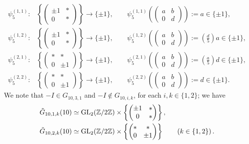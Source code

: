 \[
\begin{split}
\psi_5^{(1,1)} : &\left\{ \begin{pmatrix} \pm 1 & * \\ 0 & * \end{pmatrix} \right\} \longrightarrow \{ \pm 1 \}, \quad\quad \psi_5^{(1,1)}\left( \begin{pmatrix} a & b \\ 0 & d \end{pmatrix} \right) := a \in \{ \pm 1 \}, \\
\psi_5^{(1,2)} : &\left\{ \begin{pmatrix} \pm 1 & * \\ 0 & * \end{pmatrix} \right\} \longrightarrow \{ \pm 1 \}, \quad\quad \psi_5^{(1,2)}\left( \begin{pmatrix} a & b \\ 0 & d \end{pmatrix} \right) := \left( \frac{d}{5} \right) a \in \{ \pm 1 \}, \\
\psi_5^{(2,1)} : &\left\{ \begin{pmatrix} * & * \\ 0 & \pm 1 \end{pmatrix} \right\} \longrightarrow \{ \pm 1 \}, \quad\quad \psi_5^{(2,1)}\left( \begin{pmatrix} a & b \\ 0 & d \end{pmatrix} \right) := \left( \frac{a}{5} \right) d \in \{ \pm 1 \}, \\
\psi_5^{(2,2)} : &\left\{ \begin{pmatrix} * & * \\ 0 & \pm 1 \end{pmatrix} \right\} \longrightarrow \{ \pm 1 \}, \quad\quad \psi_5^{(2,2)}\left( \begin{pmatrix} a & b \\ 0 & d \end{pmatrix} \right) := d \in \{ \pm 1 \}.
\end{split}
\]
We note that $-I \in G_{10,3,1}$ and $-I \notin G_{10,i,k}$, for each $i, k \in \{ 1, 2 \}$; we have 
\begin{equation} \label{tildeGsub10ij}
\begin{split}
\tilde{G}_{10,1,k}(10) &\simeq \operatorname{GL}_2(\mathbb{Z}/2\mathbb{Z}) \times \left\{ \begin{pmatrix} \pm 1 & * \\ 0 & * \end{pmatrix} \right\}, \\
\tilde{G}_{10,2,k}(10) &\simeq \operatorname{GL}_2(\mathbb{Z}/2\mathbb{Z}) \times \left\{ \begin{pmatrix} * & * \\ 0 & \pm 1 \end{pmatrix} \right\}\quad\quad \left( k \in \{1, 2 \} \right).
\end{split}
\end{equation}
